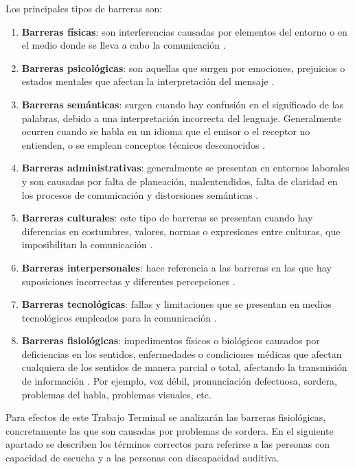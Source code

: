 Los principales tipos de barreras son:
\begin{enumerate}
    \item \textbf{Barreras físicas}: son interferencias causadas por elementos del entorno o en el medio donde se lleva a cabo la comunicación \cite{ref25}.
    \item \textbf{Barreras psicológicas}: son aquellas que surgen por emociones, prejuicios o estados mentales que afectan la interpretación del mensaje \cite{ref25}.
    \item \textbf{Barreras semánticas}: surgen cuando hay confusión en el significado de las palabras, debido a una interpretación incorrecta del lenguaje. Generalmente ocurren cuando se habla en un idioma que el emisor o el receptor no entienden, o se emplean conceptos técnicos desconocidos \cite{ref25}.
    \item \textbf{Barreras administrativas}: generalmente se presentan en entornos laborales y son causadas por falta de planeación, malentendidos, falta de claridad en los procesos de comunicación y distorsiones semánticas \cite{ref25}.
    \item \textbf{Barreras culturales}: este tipo de barreras se presentan cuando hay diferencias en costumbres, valores, normas o expresiones entre culturas, que imposibilitan la comunicación \cite{ref25}.
    \item \textbf{Barreras interpersonales}: hace referencia a las barreras en las que hay suposiciones incorrectas y diferentes percepciones \cite{ref25}.
    \item \textbf{Barreras tecnológicas}: fallas y limitaciones que se presentan en medios tecnológicos empleados para la comunicación \cite{ref25}.
    \item \textbf{Barreras fisiológicas}: impedimentos físicos o biológicos causados por deficiencias en los sentidos, enfermedades o condiciones médicas que afectan cualquiera de los sentidos de manera parcial o total, afectando la transmisión de información \cite{ref25}. Por ejemplo, voz débil, pronunciación defectuosa, sordera, problemas del habla, problemas visuales, etc.
\end{enumerate}
Para efectos de este Trabajo Terminal se analizarán las barreras fisiológicas, concretamente las que son causadas por problemas de sordera. En el siguiente apartado se describen los términos correctos para referirse a las personas con capacidad de escucha y a las personas con discapacidad auditiva.\\

